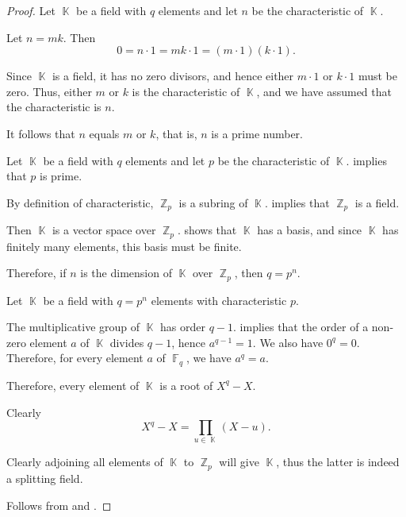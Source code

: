 \begin{proof}
   Let \( \BbbK \) be a field with \( q \) elements and let \( n \) be the characteristic of \( \BbbK \).

  Let \( n = mk \). Then
  \begin{equation*}
    0 = n \cdot 1 = mk \cdot 1 = (m \cdot 1) (k \cdot 1).
  \end{equation*}

  Since \( \BbbK \) is a field, it has no zero divisors, and hence either \( m \cdot 1 \) or \( k \cdot 1 \) must be zero. Thus, either \( m \) or \( k \) is the characteristic of \( \BbbK \), and we have assumed that the characteristic is \( n \).

  It follows that \( n \) equals \( m \) or \( k \), that is, \( n \) is a prime number.

   Let \( \BbbK \) be a field with \( q \) elements and let \( p \) be the characteristic of \( \BbbK \).  implies that \( p \) is prime.

  By definition of characteristic, \( \BbbZ_p \) is a subring of \( \BbbK \).  implies that \( \BbbZ_p \) is a field.

  Then \( \BbbK \) is a vector space over \( \BbbZ_p \).  shows that \( \BbbK \) has a basis, and since \( \BbbK \) has finitely many elements, this basis must be finite.

  Therefore, if \( n \) is the dimension of \( \BbbK \) over \( \BbbZ_p \), then \( q = p^n \).

   Let \( \BbbK \) be a field with \( q = p^n \) elements with characteristic \( p \).

  The multiplicative group of \( \BbbK \) has order \( q - 1 \).  implies that the order of a non-zero element \( a \) of \( \BbbK \) divides \( q - 1 \), hence \( a^{q - 1} = 1 \). We also have \( 0^q = 0 \). Therefore, for every element \( a \) of \( \BbbF_q \), we have \( a^q = a \).

  Therefore, every element of \( \BbbK \) is a root of \( X^q - X \).

   Clearly
  \begin{equation*}
    X^q - X = \prod_{u \in \BbbK} (X - u).
  \end{equation*}

  Clearly adjoining all elements of \( \BbbK \) to \( \BbbZ_p \) will give \( \BbbK \), thus the latter is indeed a splitting field.

   Follows from  and .
\end{proof}

